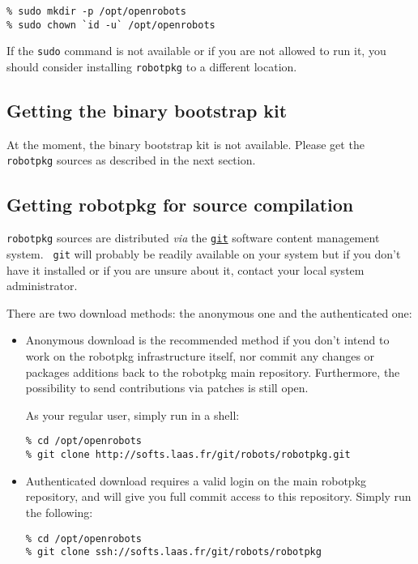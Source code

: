 \begin{verbatim}
% sudo mkdir -p /opt/openrobots
% sudo chown `id -u` /opt/openrobots
\end{verbatim}

If the {\tt sudo} command is not available or if you are not allowed to run it,
you should consider installing {\tt robotpkg} to a different location.


\subsection{Getting the binary bootstrap kit}

At the moment, the  binary bootstrap kit is not  available. Please get the {\tt
robotpkg} sources as described in the next section.


\subsection{Getting robotpkg for source compilation}

{\tt         robotpkg}    sources   are       distributed     {\em    via}  the
\href{http://git-scm.com/}{\tt git}  software  content management system.  {\tt
git} will probably be readily available on your system but if you don't have it
installed   or if you    are  unsure  about it,   contact  your  local   system
administrator.

There are two download methods: the anonymous one and the authenticated
one:

\begin{itemize}

  \item  Anonymous download is the  recommended method if  you  don't intend to
  work on  the   robotpkg infrastructure  itself,  nor commit   any  changes or
  packages  additions  back to  the  robotpkg main repository. Furthermore, the
  possibility to send contributions via patches is still open.

  As your regular user, simply run in a shell:

\begin{verbatim}
% cd /opt/openrobots
% git clone http://softs.laas.fr/git/robots/robotpkg.git
\end{verbatim}


  \item Authenticated   download requires a  valid  login on the  main robotpkg
  repository, and will give you full commit access  to this repository.  Simply
  run the following:

\begin{verbatim}
% cd /opt/openrobots
% git clone ssh://softs.laas.fr/git/robots/robotpkg
\end{verbatim}

\end{itemize}


